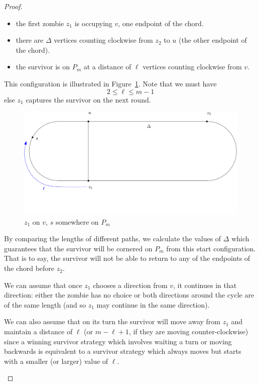 \begin{proof}
\begin{proofpart}
  \begin{itemize}
   \item the first zombie $z_1$ is occupying $v$, one endpoint of the chord.
   \item there are $\Delta$ vertices counting clockwise from $z_2$ to $u$ (the other endpoint of the chord).
   \item the survivor is on $P_m$ at a distance of $\ell$ vertices counting
   clockwise from $v$.
  \end{itemize}

  This configuration is illustrated in Figure~\ref{fig:onthechord}.
  Note that we must have
  \[2 \leq \ell \leq m-1 \tag{1} \label{bounds on ell}\]
  else $z_1$ captures the survivor on the next round.

  \begin{figure}
    \centering
    \includegraphics{q_m_n/diagram1}
    \caption{$z_1$ on $v$, $s$ somewhere on $P_m$ \label{fig:onthechord}}
  \end{figure}

  By comparing the lengths of different paths, we calculate the values of $\Delta$
  which guarantees that the survivor will be cornered on $P_m$ from this start configuration. That is to say, the survivor will not be able to return to any of the endpoints of the chord before $z_2$.

  We can assume that once $z_1$ chooses a direction from $v$, it continues in that direction: either the zombie has no choice or both directions around the cycle are of the same length (and so
  $z_1$ may continue in the same direction).

  We can also assume that on its turn the survivor will move away from
  $z_1$ and maintain a distance of $\ell$ (or $m-\ell +1$, if they are moving counter-clockwise)
  since a winning survivor strategy which involves waiting a turn
  or moving backwards is equivalent to a survivor strategy
  which always moves but starts with a smaller (or larger) value of $\ell$.


\end{proofpart}
\end{proof}
